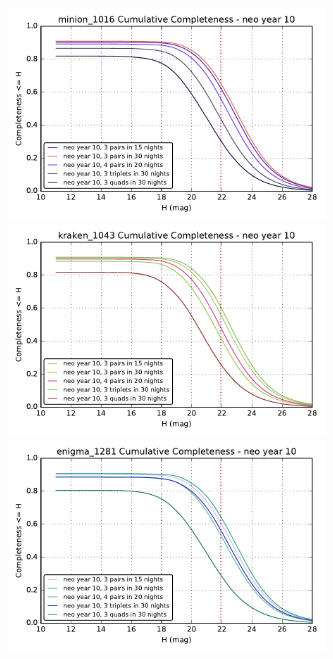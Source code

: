 \begin{figure}
%
%
%
\includegraphics[width=3.3in]{figs/solarsystem/minion_1016_CumulativeCompleteness_NEO_ComboMetricVsH.pdf}
\includegraphics[width=3.3in]{figs/solarsystem/kraken_1043_CumulativeCompleteness_NEO_ComboMetricVsH.pdf} \\
\includegraphics[width=3.3in]{figs/solarsystem/enigma_1281_CumulativeCompleteness_NEO_ComboMetricVsH.pdf}

\end{figure}
